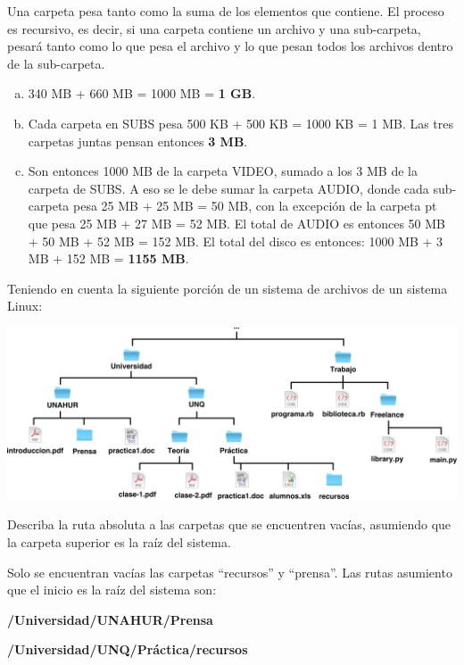 Una carpeta pesa tanto como la suma de los elementos que contiene. El proceso
es recursivo, es decir, si una carpeta contiene un archivo y una sub-carpeta,
pesará tanto como lo que pesa el archivo y lo que pesan todos los archivos
dentro de la sub-carpeta.

\begin{enumerate}[a)]
    \item 340 MB + 660 MB = 1000 MB = \textbf{1 GB}.
    \item Cada carpeta en SUBS pesa 500 KB + 500 KB = 1000 KB = 1 MB.
        Las tres carpetas juntas pensan entonces \textbf{3 MB}.
    \item Son entonces 1000 MB de la carpeta VIDEO, sumado a los 3 MB de
        la carpeta de SUBS. A eso se le debe sumar la carpeta AUDIO, donde
        cada sub-carpeta pesa 25 MB + 25 MB = 50 MB, con la excepción de
        la carpeta pt que pesa 25 MB + 27 MB = 52 MB.
        El total de AUDIO es entonces 50 MB + 50 MB + 52 MB = 152 MB.
        El total del disco es entonces: 1000 MB + 3 MB + 152 MB = \textbf{1155 MB}.
\end{enumerate}
\vspace{1cm}

\begin{exercise}
Teniendo en cuenta la siguiente porción de un sistema de archivos de un
sistema Linux:

\centerline{\includegraphics[scale=0.4]{unidades/2_informacion/2_informatica/imagenes/directorios_relativos.png}}

Describa la ruta absoluta a las carpetas que se encuentren vacías, asumiendo que la
carpeta superior es la raíz del sistema.
\end{exercise}

Solo se encuentran vacías las carpetas ``recursos'' y ``prensa''. Las rutas
asumiento que el inicio es la raíz del sistema son:

\textbf{/Universidad/UNAHUR/Prensa}

\textbf{/Universidad/UNQ/Práctica/recursos}

